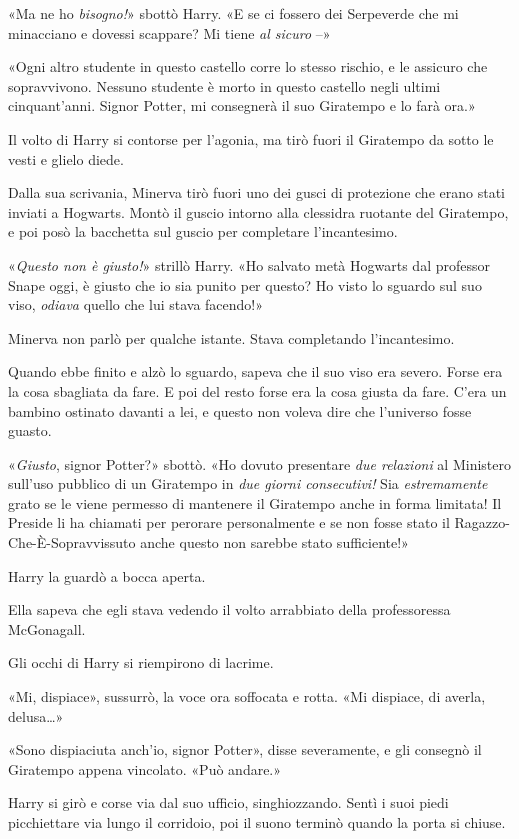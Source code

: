 «Ma ne ho \textit{bisogno!}» sbottò Harry. «E se ci fossero dei Serpeverde che mi minacciano e dovessi scappare? Mi tiene \textit{al sicuro} –»

«Ogni altro studente in questo castello corre lo stesso rischio, e le assicuro che sopravvivono. Nessuno studente è morto in questo castello negli ultimi cinquant’anni. Signor Potter, mi consegnerà il suo Giratempo e lo farà ora.»

Il volto di Harry si contorse per l’agonia, ma tirò fuori il Giratempo da sotto le vesti e glielo diede.

Dalla sua scrivania, Minerva tirò fuori uno dei gusci di protezione che erano stati inviati a Hogwarts. Montò il guscio intorno alla clessidra ruotante del Giratempo, e poi posò la bacchetta sul guscio per completare l’incantesimo.

«\textit{Questo non è giusto!}» strillò Harry. «Ho salvato metà Hogwarts dal professor Snape oggi, è giusto che io sia punito per questo? Ho visto lo sguardo sul suo viso, \textit{odiava} quello che lui stava facendo!»

Minerva non parlò per qualche istante. Stava completando l’incantesimo.

Quando ebbe finito e alzò lo sguardo, sapeva che il suo viso era severo. Forse era la cosa sbagliata da fare. E poi del resto forse era la cosa giusta da fare. C’era un bambino ostinato davanti a lei, e questo non voleva dire che l’universo fosse guasto.

«\textit{Giusto}, signor Potter?» sbottò. «Ho dovuto presentare \textit{due relazioni} al Ministero sull’uso pubblico di un Giratempo in \textit{due giorni consecutivi!} Sia \textit{estremamente} grato se le viene permesso di mantenere il Giratempo anche in forma limitata! Il Preside li ha chiamati per perorare personalmente e se non fosse stato il Ragazzo-Che-È-Sopravvissuto anche questo non sarebbe stato sufficiente!»

Harry la guardò a bocca aperta.

Ella sapeva che egli stava vedendo il volto arrabbiato della professoressa McGonagall.

Gli occhi di Harry si riempirono di lacrime.

«Mi, dispiace», sussurrò, la voce ora soffocata e rotta. «Mi dispiace, di averla, delusa…»

«Sono dispiaciuta anch’io, signor Potter», disse severamente, e gli consegnò il Giratempo appena vincolato. «Può andare.»

Harry si girò e corse via dal suo ufficio, singhiozzando. Sentì i suoi piedi picchiettare via lungo il corridoio, poi il suono terminò quando la porta si chiuse.

